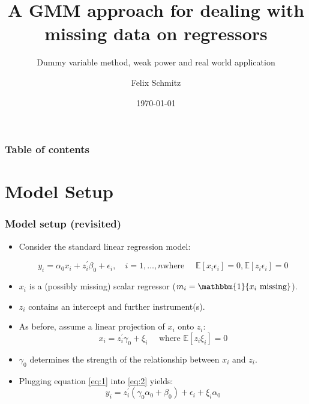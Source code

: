 \documentclass[aspectratio=1610]{beamer}
\title{A GMM approach for dealing with missing data on regressors}
\subtitle{Dummy variable method, weak power and real world application}
\date{\today}
\author{Felix Schmitz}
\begin{document}

\begin{frame}[plain]
	\titlepage
\end{frame}

\begin{framecontent}
	\frametitle{Table of contents}
\end{framecontent}

\section{Model Setup}

\begin{frame}
    \frametitle{Model setup (revisited)}
    \begin{itemize}
        \item<1-> Consider the standard linear regression model:

        \begin{equation}\label{eq:1}
            y_i = \alpha_0 x_i + z_i^{\prime} \beta_0 + \epsilon_i, \quad i= 1,\ldots,n \text{where } \quad \mathbb{E}[x_i \epsilon_i] = 0, \mathbb{E}[z_i \epsilon_i] = 0
        \end{equation}

        \item<2-> $x_i$ is a (possibly missing) scalar regressor (\( m_i = \mathbbm{1}\{x_i \text{ missing}\} \)).
		\item<2-> $z_i$ contains an intercept and further instrument(s).
        \item<2-> As before, assume a linear projection of $x_i$ onto $z_i$:
        \begin{equation}\label{eq:2}
            x_i = z_i^{\prime} \gamma_0 + \xi_i \quad \text{ where } \mathbb{E}[z_i \xi_i] = 0
        \end{equation}

        \item<3-> $\gamma_0$ determines the strength of the relationship between $x_i$ and $z_i$.
        \item<3-> Plugging equation \eqref{eq:1} into \eqref{eq:2} yields:
        \begin{equation}\label{eq:3}
            y_i = z_i^{\prime} (\gamma_0 \alpha_0 + \beta_0) + \epsilon_i + \xi_i \alpha_0
        \end{equation}
    \end{itemize}
\end{frame}
\end{document}

